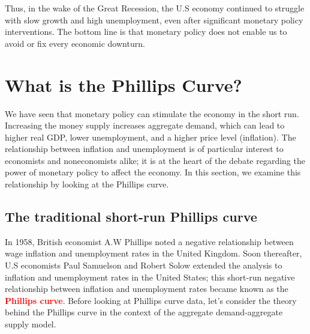 \documentclass[11pt]{article} %
\begin{document}
Thus, in the wake of the Great Recession, the U.S economy continued to struggle with slow growth and high unemployment, even after significant monetary policy interventions. The bottom line is that monetary policy does not enable us to avoid or fix every economic downturn.
\section*{\textbf{What is the Phillips Curve?}}
We have seen that monetary policy can stimulate the economy in the short run. Increasing the money supply increases aggregate demand, which can lead to higher real GDP, lower unemployment, and a higher price level (inflation). The relationship between inflation and unemployment is of particular interest to economists and noneconomists alike; it is at the heart of the debate regarding the power of monetary policy to affect the economy. In this section, we examine this relationship by looking at the Phillips curve.

\subsection*{The traditional short-run Phillips curve}
In 1958, British economist A.W Phillips noted a negative relationship between wage inflation and unemployment rates in the United Kingdom. Soon thereafter, U.S economists Paul Samuelson and Robert Solow extended the analysis to inflation and unemployment rates in the United States; this short-run negative relationship between inflation and unemployment rates became known as the \textbf{\textcolor{red}{Phillips curve}}. Before looking at Phillips curve data, let's consider the theory behind the Phillips curve in the context of the aggregate demand-aggregate supply model.
\end{document}
